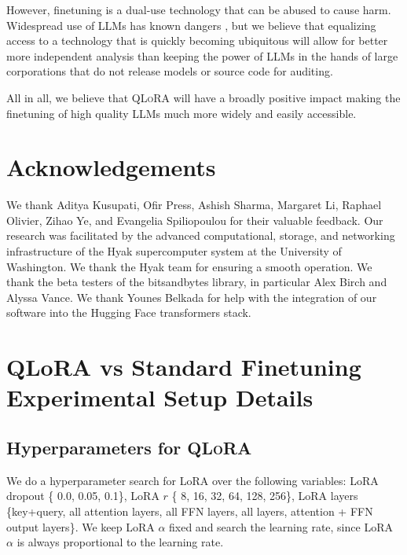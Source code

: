 \documentclass{article}
\newcommand{\method}{\textsc{QLoRA}\xspace}
\begin{document}
However, finetuning is a dual-use technology that can be abused to cause harm. Widespread use of LLMs has known dangers \citep{bommasani2021opportunities,bender2021dangers}, but we believe that equalizing access to a technology that is quickly becoming ubiquitous will allow for better more independent analysis than keeping the power of LLMs in the hands of large corporations that do not release models or source code for auditing.

All in all, we believe that \method will have a broadly positive impact making the finetuning of high quality LLMs much more widely and easily accessible.

\section*{Acknowledgements}

We thank Aditya Kusupati, Ofir Press, Ashish Sharma, Margaret Li, Raphael Olivier,  Zihao Ye, and Evangelia Spiliopoulou for their valuable feedback. Our research was facilitated by the advanced computational, storage, and networking infrastructure of the Hyak supercomputer system at the University of Washington. We thank the Hyak team for ensuring a smooth operation. We thank the beta testers of the bitsandbytes library, in particular Alex Birch and Alyssa Vance. We thank Younes Belkada for help with the integration of our software into the Hugging Face transformers stack.

\newpage


\newpage
\appendix

\section{QLoRA vs Standard Finetuning Experimental Setup Details}
\label{app:exp-setup}

\subsection{Hyperparameters for \method}

We do a hyperparameter search for LoRA over the following variables: LoRA dropout \{ 0.0, 0.05, 0.1\}, LoRA $r$ \{ 8, 16, 32, 64, 128, 256\}, LoRA layers \{key+query, all attention layers, all FFN layers, all layers, attention + FFN output layers\}. We keep LoRA $\alpha$ fixed and search the learning rate, since LoRA $\alpha$ is always proportional to the learning rate.
\end{document}
